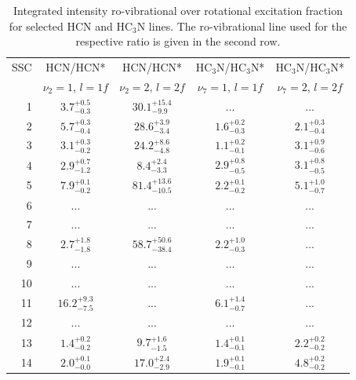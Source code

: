 \begin{table}[ph]
    \centering
    \begin{threeparttable}
        \caption[Ro-vibrational over vibrational excitation fractions]{Integrated intensity ro-vibrational over rotational excitation fraction for selected HCN and HC$_3$N lines. The ro-vibrational line used for the respective ratio is given in the second row.
        \label{SSCs: table: ratios vibrational excitation}}
        
        \begin{tabular}{r|cccc}
            \toprule
            SSC & HCN/HCN*  & HCN/HCN* & HC$_3$N/HC$_3$N* & HC$_3$N/HC$_3$N* \\
             & $\nu_2=1$, $l=1f$ & $\nu_2=2$, $l=2f$ & $\nu_7=1$, $l=1f$ & $\nu_7=2$, $l=2f$ \\
            \midrule
1 & $3.7^{+0.5}_{-0.3}$ & $30.1^{+15.4}_{-9.9}$ & ... & ...\\
2 & $5.7^{+0.3}_{-0.4}$ & $28.6^{+3.9}_{-3.4}$ & $1.6^{+0.2}_{-0.3}$ & $2.1^{+0.3}_{-0.4}$\\
3 & $3.1^{+0.3}_{-0.2}$ & $24.2^{+8.6}_{-4.8}$ & $1.1^{+0.2}_{-0.1}$ & $3.1^{+0.9}_{-0.6}$\\
4 & $2.9^{+0.7}_{-1.2}$ & $8.4^{+2.4}_{-3.3}$ & $2.9^{+0.8}_{-0.5}$ & $3.1^{+0.8}_{-0.5}$\\
5 & $7.9^{+0.1}_{-0.2}$ & $81.4^{+13.6}_{-10.5}$ & $2.2^{+0.1}_{-0.2}$ & $5.1^{+1.0}_{-0.7}$\\
6 & ... & ... & ... & ...\\
7 & ... & ... & ... & ...\\
8 & $2.7^{+1.8}_{-1.8}$ & $58.7^{+50.6}_{-38.4}$ & $2.2^{+1.0}_{-0.3}$ & ...\\
9 & ... & ... & ... & ...\\
10 & ... & ... & ... & ...\\
11 & $16.2^{+9.3}_{-7.5}$ & ... & $6.1^{+1.4}_{-0.7}$ & ...\\
12 & ... & ... & ... & ...\\
13 & $1.4^{+0.2}_{-0.2}$ & $9.7^{+1.6}_{-1.5}$ & $1.4^{+0.1}_{-0.1}$ & $2.2^{+0.2}_{-0.2}$\\
14 & $2.0^{+0.1}_{-0.0}$ & $17.0^{+2.4}_{-2.9}$ & $1.9^{+0.1}_{-0.1}$ & $4.8^{+0.2}_{-0.2}$\\
            \bottomrule
        \end{tabular}
    \end{threeparttable}
\end{table}



